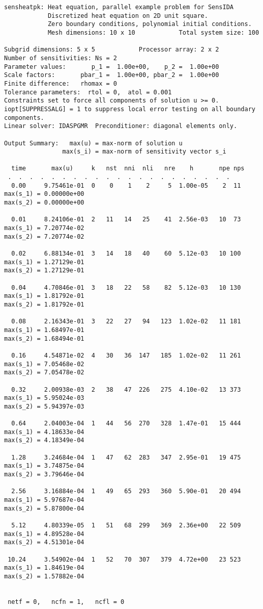 \begin{verbatim}
sensheatpk: Heat equation, parallel example problem for SensIDA 
            Discretized heat equation on 2D unit square. 
            Zero boundary conditions, polynomial initial conditions.
            Mesh dimensions: 10 x 10            Total system size: 100

Subgrid dimensions: 5 x 5            Processor array: 2 x 2
Number of sensitivities: Ns = 2
Parameter values:       p_1 =  1.00e+00,    p_2 =  1.00e+00
Scale factors:       pbar_1 =  1.00e+00, pbar_2 =  1.00e+00
Finite difference:   rhomax = 0
Tolerance parameters:  rtol = 0,  atol = 0.001
Constraints set to force all components of solution u >= 0. 
iopt[SUPPRESSALG] = 1 to suppress local error testing on all boundary components. 
Linear solver: IDASPGMR  Preconditioner: diagonal elements only.

Output Summary:   max(u) = max-norm of solution u 
                max(s_i) = max-norm of sensitivity vector s_i

  time       max(u)     k   nst  nni  nli   nre    h       npe nps
 .  .  .  .  .  .  .  .  .  .  .  .  .  .  .  .  .  .  .  .  .
  0.00     9.75461e-01  0    0    1    2     5  1.00e-05    2  11
max(s_1) = 0.00000e+00
max(s_2) = 0.00000e+00

  0.01     8.24106e-01  2   11   14   25    41  2.56e-03   10  73
max(s_1) = 7.20774e-02
max(s_2) = 7.20774e-02

  0.02     6.88134e-01  3   14   18   40    60  5.12e-03   10 100
max(s_1) = 1.27129e-01
max(s_2) = 1.27129e-01

  0.04     4.70846e-01  3   18   22   58    82  5.12e-03   10 130
max(s_1) = 1.81792e-01
max(s_2) = 1.81792e-01

  0.08     2.16343e-01  3   22   27   94   123  1.02e-02   11 181
max(s_1) = 1.68497e-01
max(s_2) = 1.68494e-01

  0.16     4.54871e-02  4   30   36  147   185  1.02e-02   11 261
max(s_1) = 7.05468e-02
max(s_2) = 7.05478e-02

  0.32     2.00938e-03  2   38   47  226   275  4.10e-02   13 373
max(s_1) = 5.95024e-03
max(s_2) = 5.94397e-03

  0.64     2.04003e-04  1   44   56  270   328  1.47e-01   15 444
max(s_1) = 4.18633e-04
max(s_2) = 4.18349e-04

  1.28     3.24684e-04  1   47   62  283   347  2.95e-01   19 475
max(s_1) = 3.74875e-04
max(s_2) = 3.79646e-04

  2.56     3.16884e-04  1   49   65  293   360  5.90e-01   20 494
max(s_1) = 5.97687e-04
max(s_2) = 5.87800e-04

  5.12     4.80339e-05  1   51   68  299   369  2.36e+00   22 509
max(s_1) = 4.89528e-04
max(s_2) = 4.51301e-04

 10.24     3.54902e-04  1   52   70  307   379  4.72e+00   23 523
max(s_1) = 1.84619e-04
max(s_2) = 1.57882e-04


 netf = 0,   ncfn = 1,   ncfl = 0 

\end{verbatim}

